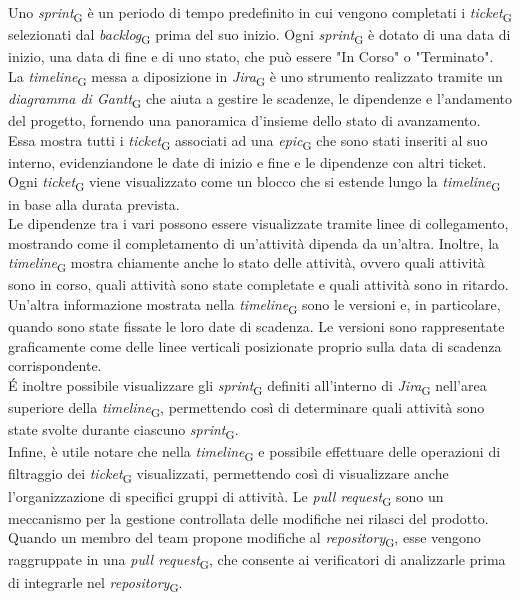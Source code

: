 Uno \textit{sprint}\textsubscript{G} è un periodo di tempo predefinito in cui vengono completati i \textit{ticket}\textsubscript{G} selezionati dal \textit{backlog}\textsubscript{G} prima del suo inizio. Ogni \textit{sprint}\textsubscript{G} è dotato di una data di inizio, una data di fine e di uno stato, che può essere "In Corso" o "Terminato".
La \textit{timeline}\textsubscript{G} messa a diposizione in \textit{Jira}\textsubscript{G} è uno strumento realizzato tramite un \textit{diagramma di Gantt}\textsubscript{G} che aiuta a gestire le scadenze, le dipendenze e l'andamento del progetto, fornendo una panoramica d'insieme dello stato di avanzamento.\\
Essa mostra tutti i \textit{ticket}\textsubscript{G} associati ad una \textit{epic}\textsubscript{G} che sono stati inseriti al suo interno, evidenziandone le date di inizio e fine e le dipendenze con altri ticket. Ogni \textit{ticket}\textsubscript{G} viene visualizzato come un blocco che si estende lungo la \textit{timeline}\textsubscript{G} in base alla durata prevista.\\
Le dipendenze tra i vari  possono essere visualizzate tramite linee di collegamento, mostrando come il completamento di un'attività dipenda da un’altra. Inoltre, la \textit{timeline}\textsubscript{G} mostra chiamente anche lo stato delle attività, ovvero quali attività sono in corso, quali attività sono state completate e quali attività sono in ritardo.\\
Un'altra informazione mostrata nella \textit{timeline}\textsubscript{G} sono le versioni e, in particolare, quando sono state fissate le loro date di scadenza. Le versioni sono rappresentate graficamente come delle linee verticali posizionate proprio sulla data di scadenza corrispondente.\\
\'E inoltre possibile visualizzare gli \textit{sprint}\textsubscript{G} definiti all'interno di \textit{Jira}\textsubscript{G} nell'area superiore della \textit{timeline}\textsubscript{G}, permettendo così di determinare quali attività sono state svolte durante ciascuno \textit{sprint}\textsubscript{G}.\\
Infine, è utile notare che nella \textit{timeline}\textsubscript{G} e possibile effettuare delle operazioni di filtraggio dei \textit{ticket}\textsubscript{G} visualizzati, permettendo così di visualizzare anche l'organizzazione di specifici gruppi di attività.
Le \textit{pull request}\textsubscript{G} sono un meccanismo per la gestione controllata delle modifiche nei rilasci del prodotto. Quando un membro del team propone modifiche al \textit{repository}\textsubscript{G}, esse vengono raggruppate in una \textit{pull request}\textsubscript{G}, che consente ai verificatori di analizzarle prima di integrarle nel \textit{repository}\textsubscript{G}.\\
